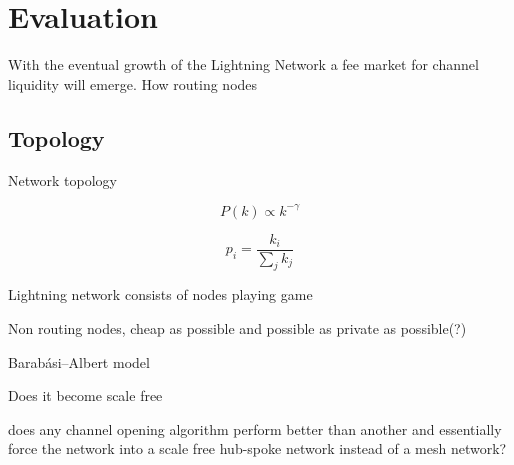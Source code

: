 \chapter{Evaluation}

With the eventual growth of the Lightning Network a fee market for channel liquidity will emerge. How routing nodes 

\section{Topology}

Network topology

\[ P(k) \propto k^{-\gamma} \]

\[ p_i = \dfrac{k_i}{\sum_{j}^{}k_j}  \]


Lightning network consists of nodes playing game

Non routing nodes, cheap as possible and possible as private as possible(?) 

Barabási–Albert model

Does it become scale free

does any channel opening algorithm perform better than another and essentially force the network into a scale free hub-spoke network instead of a mesh network?





